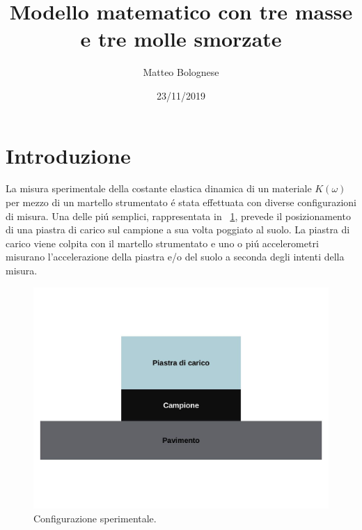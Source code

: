 \documentclass[12pt,a4paper]{article}
\begin{document}
 	\title{Modello matematico con tre masse e tre molle smorzate} \author{Matteo Bolognese}
 	\date{23/11/2019}
 	\maketitle
 	
 \section{Introduzione}
	La misura sperimentale della costante elastica dinamica di un materiale $K(\omega)$ per mezzo di un martello strumentato \'e stata effettuata con diverse configurazioni di misura. Una delle pi\'u semplici, rappresentata in \figurename~\ref{fig:Phisical-system}, prevede il posizionamento di una piastra di carico sul campione a sua volta poggiato al suolo. La piastra di carico viene colpita con il martello strumentato e uno o pi\'u accelerometri misurano l'accelerazione della piastra e/o del suolo a seconda degli intenti della misura.
	
	
	\begin{figure}
		\centering	
		\includegraphics[width=13cm]{Phisical-system.jpg}
		\caption{Configurazione sperimentale.}
		\label{fig:Phisical-system}
	\end{figure}
 	
\end{document}
